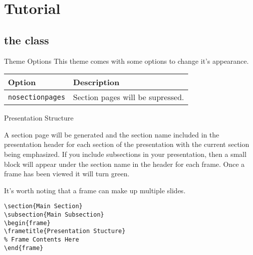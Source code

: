 \documentclass[compress,PxFont]{beamer}
\begin{document}
%
%

\section{Tutorial}


\subsection{the class}


\begin{frame}{Theme Options}
This theme comes with some options to change it's appearance.
\begin{table}[]
	\begin{tabularx}{\linewidth}{l>{\raggedright}X}
		\toprule
		\textbf{Option}			& \textbf{Description} \tabularnewline
		\midrule
		\texttt{nosectionpages} & Section pages will be supressed.\tabularnewline
		\bottomrule
	\end{tabularx}
	\label{tab:options}
\end{table}
\end{frame}


\begin{frame}[containsverbatim]{Presentation Structure}

A section page will be generated and the section name included in the presentation header for each section of the presentation with the current section being emphasized.  If you include subsections in your presentation, then a small block will appear under the section name in the header for each frame.  Once a frame has been viewed it will turn green.

It's worth noting that a frame can make up multiple slides.

\begin{verbatim}
\section{Main Section}
\subsection{Main Subsection}
\begin{frame}
\frametitle{Presentation Stucture}
% Frame Contents Here
\end{frame}
\end{verbatim}
\end{frame}
\end{document}
